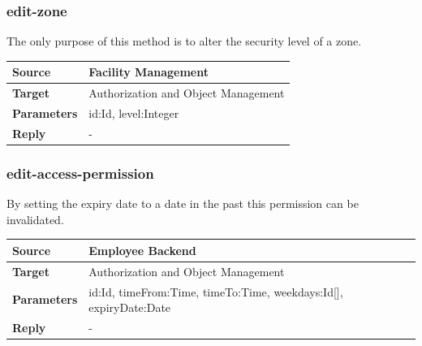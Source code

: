 \documentclass[12pt,a4paper,titlepage,oneside]{scrartcl}
\begin{document}
\subsubsection{edit-zone}

The only purpose of this method is to alter the security level of a zone.

\begin{table}[h]

    \centering

    \begin{tabular}{|l|p{12cm}|} \hline

    \textbf{Source}&Facility Management\\ \hline

    \textbf{Target}&Authorization and Object Management\\ \hline

    \textbf{Parameters}&id:Id, level:Integer\\ \hline

    \textbf{Reply}&-\\ \hline

    \end{tabular}

\end{table}

\subsubsection{edit-access-permission}

By setting the expiry date to a date in the past this permission can be invalidated.

\begin{table}[h]

    \centering

    \begin{tabular}{|l|p{12cm}|} \hline

    \textbf{Source}&Employee Backend\\ \hline

    \textbf{Target}&Authorization and Object Management\\ \hline

    \textbf{Parameters}&id:Id, timeFrom:Time, timeTo:Time, weekdays:Id[], expiryDate:Date\\ \hline

    \textbf{Reply}&-\\ \hline

    \end{tabular}

\end{table}
\end{document}

